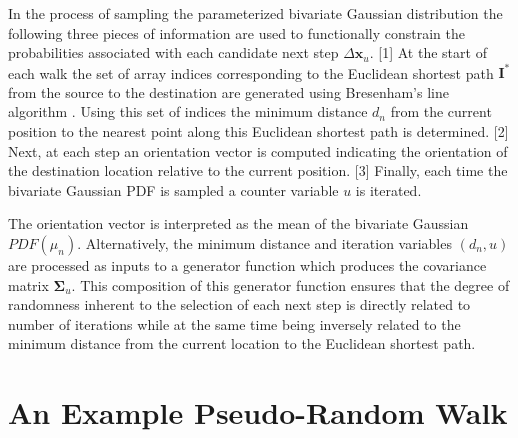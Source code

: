 In the process of sampling the parameterized bivariate Gaussian distribution the following three pieces of information are used to functionally constrain the probabilities associated with each candidate next step $\Delta\textbf{x}_u$. [1] At the start of each walk the set of array indices corresponding to the Euclidean shortest path $\textbf{I}^*$ from the source to the destination are generated using Bresenham's line algorithm \cite{Bresenham1977}. Using this set of indices the minimum distance $d_n$ from the current position to the nearest point along this Euclidean shortest path is determined. [2] Next, at each step an orientation vector is computed indicating the orientation of the destination location relative to the current position. [3] Finally, each time the bivariate Gaussian PDF is sampled a counter variable $u$ is iterated. 

The orientation vector is interpreted as the mean of the bivariate Gaussian $PDF(\mu_n)$. Alternatively, the minimum distance and iteration variables $(d_n ,u)$ are processed as inputs to a generator function which produces the covariance matrix $\boldsymbol{\Sigma}_u$. This composition of this generator function ensures that the degree of randomness inherent to the selection of each next step is directly related to number of iterations while at the same time being inversely related to the minimum distance from the current location to the Euclidean shortest path.
            
\section{An Example Pseudo-Random Walk}

